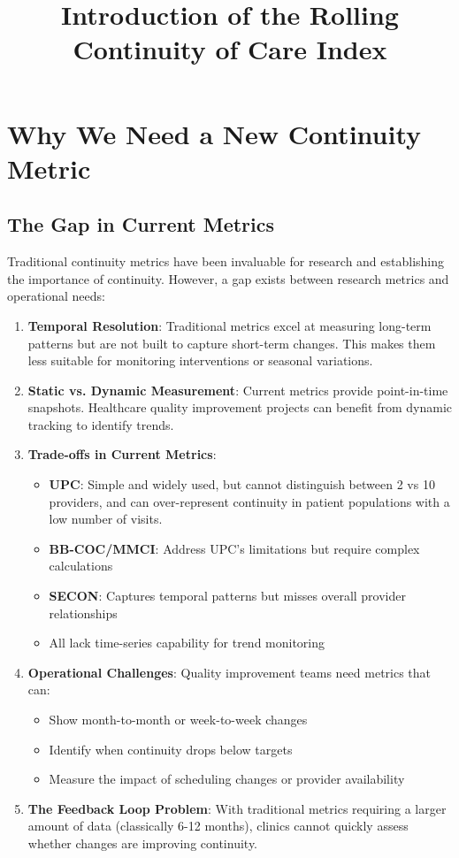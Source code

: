 \documentclass[11pt,a4paper]{article}
\title{Introduction of the Rolling Continuity of Care Index}
\author{}
\date{}
\begin{document}
\maketitle

\section{Why We Need a New Continuity Metric}

\subsection{The Gap in Current Metrics}

Traditional continuity metrics have been invaluable for research and establishing the importance of continuity. However, a gap exists between research metrics and operational needs:

\begin{enumerate}
\item \textbf{Temporal Resolution}: Traditional metrics excel at measuring long-term patterns but are not built to capture short-term changes. This makes them less suitable for monitoring interventions or seasonal variations.

\item \textbf{Static vs. Dynamic Measurement}: Current metrics provide point-in-time snapshots. Healthcare quality improvement projects can benefit from  dynamic tracking to identify trends.

\item \textbf{Trade-offs in Current Metrics}:
\begin{itemize}
\item \textbf{UPC}: Simple and widely used, but cannot distinguish between 2 vs 10 providers, and can over-represent continuity in patient populations with a low number of visits.
\item \textbf{BB-COC/MMCI}: Address UPC's limitations but require complex calculations
\item \textbf{SECON}: Captures temporal patterns but misses overall provider relationships
\item All lack time-series capability for trend monitoring
\end{itemize}

\item \textbf{Operational Challenges}: Quality improvement teams need metrics that can:
\begin{itemize}
\item Show month-to-month or week-to-week changes
\item Identify when continuity drops below targets
\item Measure the impact of scheduling changes or provider availability
\end{itemize}

\item \textbf{The Feedback Loop Problem}: With traditional metrics requiring a larger amount of data (classically 6-12 months), clinics cannot quickly assess whether changes are improving continuity.
\end{enumerate}
\end{document}
